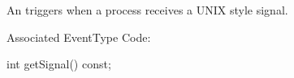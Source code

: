 
An  triggers when a process receives a UNIX style signal.

Associated EventType Code: 

\begin{apient}
int getSignal() const;
\end{apient}

